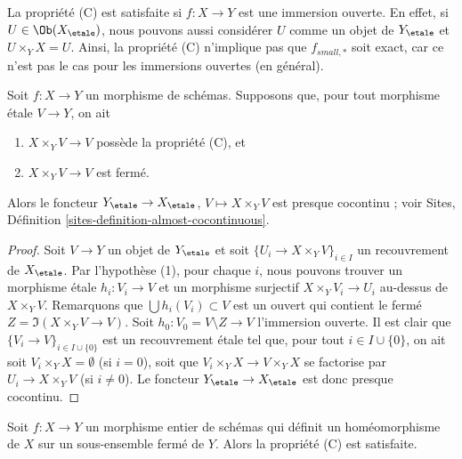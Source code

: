 \begin{remark}
\label{remark-property-C-strong}
La propri\'et\'e (C) est satisfaite si $f : X \to Y$ est une immersion ouverte. En effet, si
$U \in \Ob(X_\etale)$, nous pouvons aussi consid\'erer $U$ comme un objet
de $Y_\etale$ et $U \times_Y X = U$. Ainsi, la propri\'et\'e (C)
n'implique pas que $f_{small, *}$ soit exact, car ce n'est pas
le cas pour les immersions ouvertes (en g\'en\'eral).
\end{remark}

\begin{lemma}
\label{lemma-property-C-closed-implies}
Soit $f : X \to Y$ un morphisme de sch\'emas. Supposons que,
pour tout morphisme \'etale $V \to Y$, on ait
\begin{enumerate}
\item $X \times_Y V \to V$ poss\`ede la propri\'et\'e (C), et
\item $X \times_Y V \to V$ est ferm\'e.
\end{enumerate}
Alors le foncteur
$Y_\etale \to X_\etale$, $V \mapsto X \times_Y V$
est presque cocontinu ; voir
Sites, D\'efinition \ref{sites-definition-almost-cocontinuous}.
\end{lemma}

\begin{proof}
Soit $V \to Y$ un objet de $Y_\etale$ et soit
$\{U_i \to X \times_Y V\}_{i \in I}$ un recouvrement de $X_\etale$.
Par l'hypoth\`ese (1), pour chaque $i$, nous pouvons trouver un morphisme \'etale
$h_i : V_i \to V$ et un morphisme surjectif $X \times_Y V_i \to U_i$
au-dessus de $X \times_Y V$. Remarquons que $\bigcup h_i(V_i) \subset V$ est un
ouvert qui contient le ferm\'e $Z = \Im(X \times_Y V \to V)$.
Soit $h_0 : V_0 = V \setminus Z \to V$ l'immersion ouverte.
Il est clair que $\{V_i \to V\}_{i \in I \cup \{0\}}$ est un
recouvrement \'etale tel que, pour tout $i \in I \cup \{0\}$, on ait
soit $V_i \times_Y X = \emptyset$ (si $i = 0$), soit
que $V_i \times_Y X \to V \times_Y X$ se factorise par $U_i \to X \times_Y V$
(si $i \not = 0$). Le foncteur $Y_\etale \to X_\etale$ est donc
presque cocontinu.
\end{proof}

\begin{lemma}
\label{lemma-integral-homeo-onto-image-C}
Soit $f : X \to Y$ un morphisme entier de sch\'emas qui d\'efinit
un hom\'eomorphisme de $X$ sur un sous-ensemble ferm\'e de $Y$.
Alors la propri\'et\'e (C) est satisfaite.
\end{lemma}

